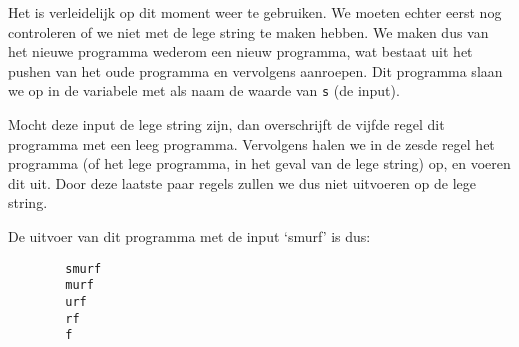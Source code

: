 \begin{exmp}
	Het is verleidelijk op dit moment weer  te gebruiken. We
	moeten echter eerst nog controleren of we niet met de lege string te maken
	hebben. We maken dus van het nieuwe programma wederom een nieuw programma,
	wat bestaat uit het pushen van het oude programma en vervolgens
	 aanroepen. Dit programma slaan we op in de variabele met als
	naam de waarde van \verb$s$ (de input).

	Mocht deze input de lege string zijn, dan overschrijft de vijfde regel dit
	programma met een leeg programma. Vervolgens halen we in de zesde regel het
	programma (of het lege programma, in het geval van de lege string) op, en
	voeren dit uit. Door deze laatste paar regels zullen we dus niet
	 uitvoeren op de lege string.

	\medskip
	De uitvoer van dit programma met de input `smurf' is dus:

	\begin{verbatim}
		smurf
		murf
		urf
		rf
		f
	\end{verbatim}
\end{exmp}

